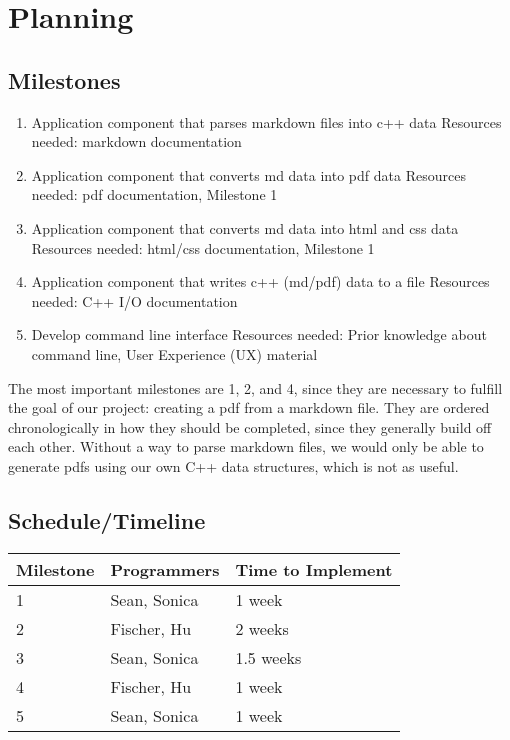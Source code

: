 \section{Planning}

\subsection{Milestones}
\begin{enumerate}
	\item Application component that parses markdown files into c++ data
\newline
Resources needed: markdown documentation
	\item Application component that converts md data into pdf data
\newline
Resources needed: pdf documentation, Milestone 1
	\item Application component that converts md data into html and css data
\newline
Resources needed: html/css documentation, Milestone 1
	\item Application component that writes c++ (md/pdf) data to a file
\newline
Resources needed: C++ I/O documentation
	\item Develop command line interface
\newline
Resources needed: Prior knowledge about command line, User Experience (UX) material
\end{enumerate}
The most important milestones are 1, 2, and 4, since they are necessary to fulfill the goal of our project: creating a pdf from a markdown file. They are ordered chronologically in how they should be completed, since they generally build off each other. Without a way to parse markdown files, we would only be able to generate pdfs using our own C++ data structures, which is not as useful. 


\subsection{Schedule/Timeline}


\begin{center}
    \begin{tabular}{ | l | l | p{5cm} |}
    \hline
    Milestone & Programmers & Time to Implement \\ \hline
    1 & Sean, Sonica & 1 week \\ \hline
    2 & Fischer, Hu & 2 weeks \\ \hline
    3 & Sean, Sonica & 1.5 weeks \\ \hline
    4 & Fischer, Hu & 1 week \\ \hline
    5 & Sean, Sonica & 1 week \\ \hline
    \end{tabular}
\end{center}



